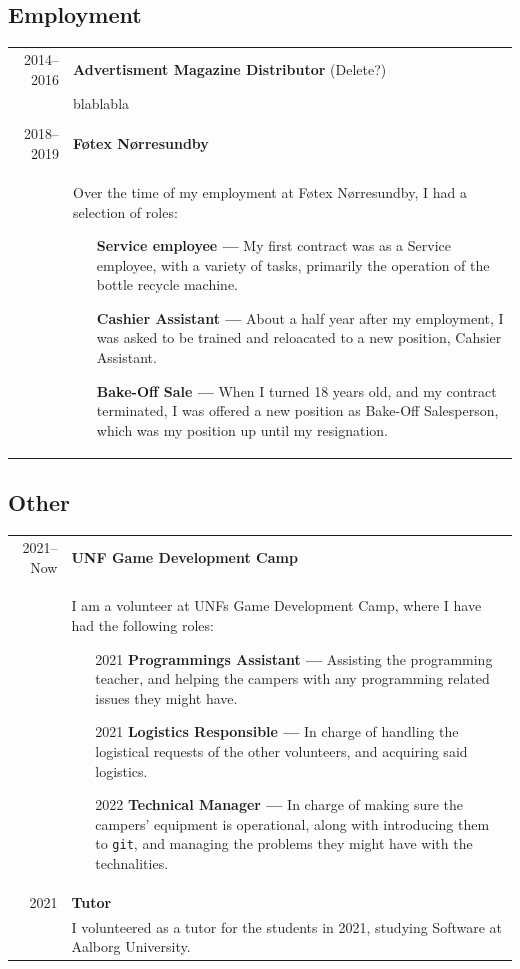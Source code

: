 \documentclass{article}
\begin{document}
    \subsection*{Employment}
    \begin{tabular}{r|p{.82\linewidth}}%
        2014--2016 & \textbf{Advertisment Magazine Distributor} (Delete?)\\
    &   blablabla
        \\\\
        2018--2019 & \textbf{Føtex Nørresundby}\\
    &   Over the time of my employment at Føtex Nørresundby, I had a selection of roles:
        \begin{itemize}\setlength\itemsep{0em}
            \item[] \textbf{Service employee --- } My first contract was as a Service employee,
                with a variety of tasks, primarily the operation of the bottle recycle machine.
            \item[] \textbf{Cashier Assistant --- } About a half year after my employment,
                I was asked to be trained and reloacated to a new position, Cahsier Assistant.
            \item[] \textbf{Bake-Off Sale --- } When I turned 18 years old, and my contract
                terminated, I was offered a new position as Bake-Off Salesperson, which was my
                position up until my resignation.

        \end{itemize}
    \end{tabular}

    \subsection*{Other}
    \begin{tabular}{r|p{.82\linewidth}}
        2021--Now & \textbf{UNF Game Development Camp}\\
    &   I am a volunteer at UNFs Game Development Camp, where I have had the following roles:
        \begin{itemize}\setlength\itemsep{0em}
            \item[2021] \textbf{Programmings Assistant ---} Assisting the programming teacher, and
                helping the campers with any programming related issues they might have.
            \item[2021] \textbf{Logistics Responsible ---} In charge of handling the logistical
                requests of the other volunteers, and acquiring said logistics.
            \item[2022] \textbf{Technical Manager ---} In charge of making sure the campers'
                equipment is operational, along with introducing them to \verb|git|, and managing
                the problems they might have with the technalities.
        \end{itemize}
        \\
        2021 & \textbf{Tutor}\\
    &   I volunteered as a tutor for the students in 2021, studying Software at Aalborg University. 
    \end{tabular}
\end{document}
